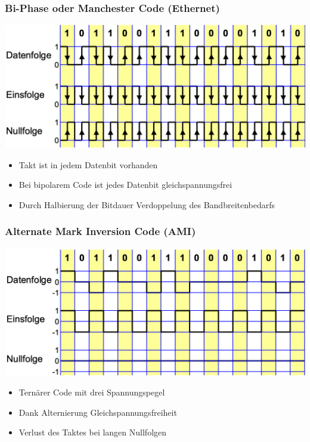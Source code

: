 \subsubsection{Bi-Phase oder Manchester Code (Ethernet)}
\begin{center}
    \includegraphics[width=\linewidth]{graphic/signale_analyisieren/Bi-Phase oder Manchester Code.png}
\end{center}
\vspace{-8pt}
\begin{itemize}
    \item Takt ist in jedem Datenbit vorhanden
    \item Bei bipolarem Code ist jedes Datenbit gleichspannungsfrei
    \item Durch Halbierung der Bitdauer Verdoppelung des Bandbreitenbedarfs
\end{itemize}

\subsubsection{Alternate Mark Inversion Code (AMI)}
\begin{center}
    \includegraphics[width=\linewidth]{graphic/signale_analyisieren/Alternate Mark Inversion Code (AMI).png}
\end{center}
\vspace{-8pt}
\begin{itemize}
    \item Ternärer Code mit drei Spannungspegel
    \item Dank Alternierung Gleichspannungsfreiheit
    \item Verlust des Taktes bei langen Nullfolgen
\end{itemize}


